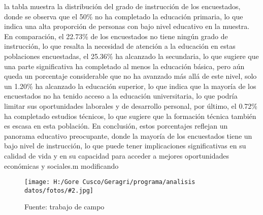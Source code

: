 \documentclass{article}\usepackage[]{graphicx}\usepackage[table]{xcolor}
\makeatletter
\newenvironment{kframe}{%
 \def\at@end@of@kframe{}%
 \ifinner\ifhmode%
  \def\at@end@of@kframe{\end{minipage}}%
  \begin{minipage}{\columnwidth}%
 \fi\fi%
 \def\FrameCommand##1{\hskip\@totalleftmargin \hskip-\fboxsep
 \colorbox{shadecolor}{##1}\hskip-\fboxsep
     \hskip-\linewidth \hskip-\@totalleftmargin \hskip\columnwidth}%
 \MakeFramed {\advance\hsize-\width
   \@totalleftmargin\z@ \linewidth\hsize
   \@setminipage}}%
 {\par\unskip\endMakeFramed%
 \at@end@of@kframe}
\newenvironment{fotos}[2]
{\begin{figure}[H]
	\centering
	\caption{#1}
	\texttt{[image: H:/Gore Cusco/Geragri/programa/analisis datos/fotos/\#2.jpg]}
	\caption*{Fuente: trabajo de campo}}
{\end{figure}}
\makeatother
\begin{document}
la tabla muestra la distribución del grado de instrucción de los encuestados, donde se observa que el 50\% no ha completado la educación primaria, lo que indica una alta proporción de personas con bajo nivel educativo en la muestra. En comparación, el 22.73\% de los encuestados no tiene ningún grado de instrucción, lo que resalta la necesidad de atención a la educación en estas poblaciones encuestadas, el 25.36\% ha alcanzado la secundaria, lo que sugiere que una parte significativa ha completado al menos la educación básica, pero aún queda un porcentaje considerable que no ha avanzado más allá de este nivel, solo un 1.20\% ha alcanzado la educación superior, lo que indica que la mayoría de los encuestados no ha tenido acceso a la educación universitaria, lo que podría limitar sus oportunidades laborales y de desarrollo personal, por último, el 0.72\% ha completado estudios técnicos, lo que sugiere que la formación técnica también es escasa en esta población. En conclusión, estos porcentajes reflejan un panorama educativo preocupante, donde la mayoría de los encuestados tiene un bajo nivel de instrucción, lo que puede tener implicaciones significativas en su calidad de vida y en su capacidad para acceder a mejores oportunidades económicas y sociales.m modificando
\begin{fotos}
{Aplicacion de encuestas}{2}
\end{fotos}


\begin{table}[H]
  \centering
  \caption{Tipo de ingreso familiar}
\begin{kframe}


{\ttfamily\noindent\bfseries{}}

{\ttfamily\noindent\bfseries{}}

{\ttfamily\noindent\bfseries\color{errorcolor}{\#\# Error: objeto 'datos' no encontrado}}

{\ttfamily\noindent\bfseries\color{errorcolor}{\#\# Error: objeto 'datos' no encontrado}}

{\ttfamily\noindent\bfseries\color{errorcolor}{\#\# Error: objeto 'datos' no encontrado}}

{\ttfamily\noindent\bfseries\color{errorcolor}{\#\# Error: objeto 'filtered\_data' no encontrado}}

{\ttfamily\noindent\bfseries\color{errorcolor}{\#\# Error: objeto 'filtered\_data' no encontrado}}

{\ttfamily\noindent\bfseries\color{errorcolor}{\#\# Error: objeto 'tabla' no encontrado}}

{\ttfamily\noindent\bfseries\color{errorcolor}{\#\# Error: objeto 'tabla' no encontrado}}

{\ttfamily\noindent\bfseries\color{errorcolor}{\#\# Error: objeto 'tabla\_latex' no encontrado}}\end{kframe}
  \caption*{Fuente: Trabajo de campo}
\end{table}
\end{document}
